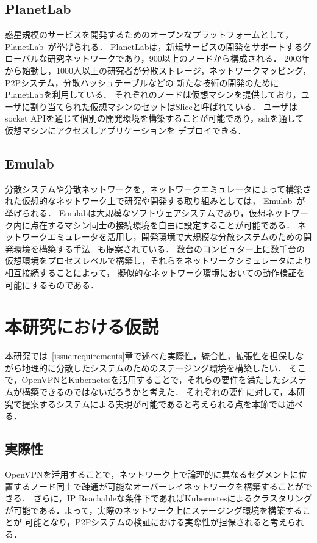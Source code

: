 \subsection{PlanetLab}
\label{consideration:related-works:planetlab}

惑星規模のサービスを開発するためのオープンなプラットフォームとして，PlanetLab~\cite{PlanetLab}が挙げられる．
PlanetLabは，新規サービスの開発をサポートするグローバルな研究ネットワークであり，900以上のノードから構成される．
2003年から始動し，1000人以上の研究者が分散ストレージ，ネットワークマッピング，P2Pシステム，分散ハッシュテーブルなどの
新たな技術の開発のためにPlanetLabを利用している．
それぞれのノードは仮想マシンを提供しており，ユーザに割り当てられた仮想マシンのセットはSliceと呼ばれている．
ユーザはsocket APIを通じて個別の開発環境を構築することが可能であり，sshを通して仮想マシンにアクセスしアプリケーションを
デプロイできる．

\subsection{Emulab}
\label{consideration:related-works:emulab}

分散システムや分散ネットワークを，ネットワークエミュレータによって構築された仮想的なネットワーク上で研究や開発する取り組みとしては，
Emulab~\cite{Emulab}が挙げられる．
Emulabは大規模なソフトウェアシステムであり，仮想ネットワーク内に点在するマシン同士の接続環境を自由に設定することが可能である．
ネットワークエミュレータを活用し，開発環境で大規模な分散システムのための開発環境を構築する手法
~\cite{RelatedWork1}も提案されている．
数台のコンピュター上に数千台の仮想環境をプロセスレベルで構築し，それらをネットワークシミュレータにより相互接続することによって，
擬似的なネットワーク環境においての動作検証を可能にするものである．

\section{本研究における仮説}
\label{issue:hypothesis}
本研究では~\ref{issue:requirements}章で述べた実際性，統合性，拡張性を担保しながら地理的に分散したシステムのためのステージング環境を構築したい．
そこで，OpenVPNとKubernetesを活用することで，それらの要件を満たしたシステムが構築できるのではないだろうかと考えた．
それぞれの要件に対して，本研究で提案するシステムによる実現が可能であると考えられる点を本節では述べる．

\subsection{実際性}
OpenVPNを活用することで，ネットワーク上で論理的に異なるセグメントに位置するノード同士で疎通が可能なオーバーレイネットワークを構築することができる．
さらに，IP Reachableな条件下であればKubernetesによるクラスタリングが可能である．よって，実際のネットワーク上にステージング環境を構築することが
可能となり，P2Pシステムの検証における実際性が担保されると考えられる．

